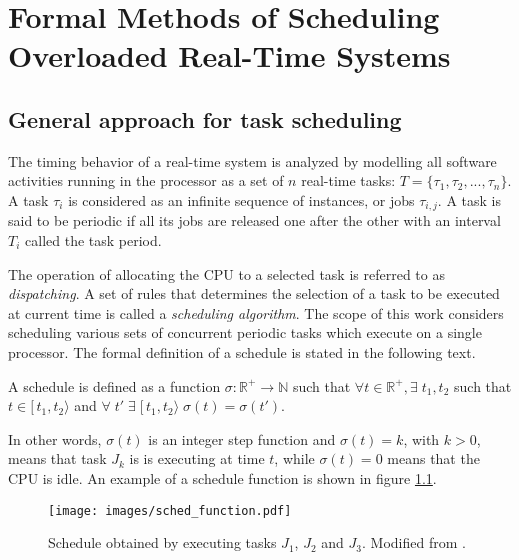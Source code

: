 \chapter{Formal Methods of Scheduling Overloaded Real-Time Systems}
\section{General approach for task scheduling}
The timing behavior of a real-time system is analyzed by modelling all software activities running in the processor as a set of $n$ real-time tasks: $T = \{\tau_1, \tau_2, ..., \tau_n\}$.
A task $\tau_i$ is considered as an infinite sequence of instances, or jobs $\tau_{i,j}$.
A task is said to be periodic if all its jobs are released one after the other with an interval $T_i$ called the task period.

The operation of allocating the CPU to a selected task is referred to as \textit{dispatching}.
A set of rules that determines the selection of a task to be executed at current time is called a 
\textit{scheduling algorithm}.
The scope of this work considers scheduling various sets of concurrent periodic tasks which execute on a single processor.
The formal definition of a schedule is stated in the following text.
\begin{mydef}
A schedule is defined as a function $\sigma : \mathbb{R}^{+} \rightarrow \mathbb{N}$ such that 
$\forall t \in \mathbb{R}^{+}, \exists \; t_1, t_2$ such that $t \in [\, t_1, t_2 \rangle$ and 
$\forall \; t' \; \exists \; [\, t_1, t_2 \rangle \; \sigma(t) = \sigma(t')$.
\end{mydef}
In other words, $\sigma(t)$ is an integer step function and $\sigma(t) = k$, with $k > 0$, means that task $J_k$ is is executing at time $t$, while $\sigma(t) = 0$ means that the CPU is idle.
An example of a schedule function is shown in figure \ref{schedule_function}.
\begin{figure}[ht]
    \centering
    \texttt{[image: images/sched\_function.pdf]}
    \caption{Schedule obtained by executing tasks $J_1$, $J_2$ and $J_3$. Modified from \cite{buttazzo2011hard}.}
    \label{schedule_function}
\end{figure}


